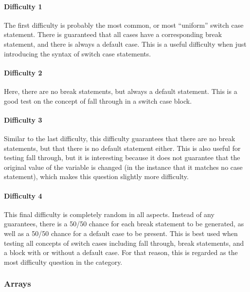 \documentclass{article}
\begin{document}
\paragraph{Difficulty 1} \hfill \par

The first difficulty is probably the most common, or most ``uniform'' switch case statement. There is guaranteed that all cases have a corresponding break statement, and there is always a
default case. This is a useful difficulty when just introducing the syntax of switch case statements.

\paragraph{Difficulty 2} \hfill \par 

Here, there are no break statements, but always a default statement. This is a good test on the concept of fall through in a switch case block.

\paragraph{Difficulty 3} \hfill \par

Similar to the last difficulty, this difficulty guarantees that there are no break statements, but that there is no default statement either. This is also useful for testing fall through, but it is 
interesting because it does not guarantee that the original value of the variable is changed (in the instance that it matches no case statement), which makes this question slightly more 
difficulty.

\paragraph{Difficulty 4} \hfill \par

This final difficulty is completely random in all aspects. Instead of any guarantees, there is a 50/50 chance for each break statement to be generated, as well as a 50/50 chance for a default 
case to be present. This is best used when testing all concepts of switch cases including fall through, break statements, and a block with or without a default case. For that reason, this is 
regarded as the most difficulty question in the category. 

\subsubsection{Arrays} \label{subsubsec-arrays}
\end{document}
